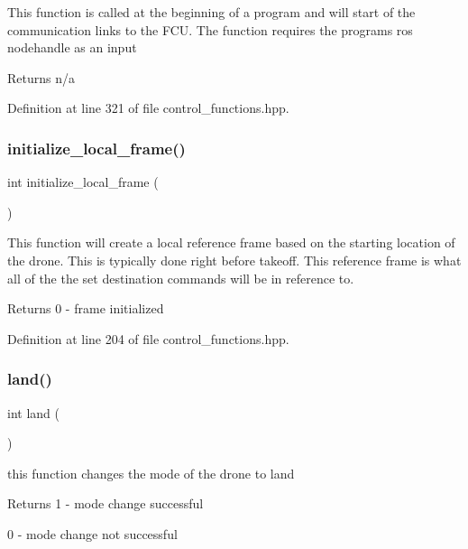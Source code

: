 This function is called at the beginning of a program and will start of the communication links to the F\+CU. The function requires the program\textquotesingle{}s ros nodehandle as an input \begin{DoxyReturn}{Returns}
n/a 
\end{DoxyReturn}


Definition at line 321 of file control\+\_\+functions.\+hpp.

\mbox{\label{group__control__functions_ga2a1100bb15673a9322c5be3bb8e9999f}} 
\subsubsection{\texorpdfstring{initialize\_local\_frame()}{initialize\_local\_frame()}}
{\footnotesize\ttfamily int initialize\+\_\+local\+\_\+frame (\begin{DoxyParamCaption}{ }\end{DoxyParamCaption})}

This function will create a local reference frame based on the starting location of the drone. This is typically done right before takeoff. This reference frame is what all of the the set destination commands will be in reference to. \begin{DoxyReturn}{Returns}
0 -\/ frame initialized 
\end{DoxyReturn}


Definition at line 204 of file control\+\_\+functions.\+hpp.

\mbox{\label{group__control__functions_ga52a11a139e56315de52d2ab439b0d203}} 
\subsubsection{\texorpdfstring{land()}{land()}}
{\footnotesize\ttfamily int land (\begin{DoxyParamCaption}{ }\end{DoxyParamCaption})}

this function changes the mode of the drone to land \begin{DoxyReturn}{Returns}
1 -\/ mode change successful 

0 -\/ mode change not successful 
\end{DoxyReturn}


